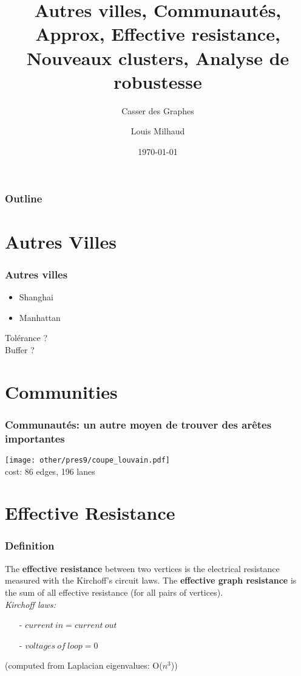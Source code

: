 \documentclass[aspectratio=169]{beamer}
\title{Autres villes, Communautés, Approx, Effective resistance, Nouveaux clusters, Analyse de robustesse}
\subtitle{Casser des Graphes}
\author{Louis Milhaud}
\institute{Complex Networks - LIP6}
\date{\today}
\begin{document}
    \begin{frame}
        \titlepage
    \end{frame}

    \begin{frame}
        \frametitle{Outline}
        \tableofcontents
    \end{frame}

    \section{Autres Villes}
    \begin{frame}
        \frametitle{Autres villes}
        \begin{itemize}
            \item Shanghai
            \item Manhattan
        \end{itemize}
        Tolérance ?\\
        Buffer ?    
    \end{frame}

    \section{Communities}
    \begin{frame}
        \frametitle{Communautés: un autre moyen de trouver des arêtes importantes}
        \centering
        \texttt{[image: other/pres9/coupe\_louvain.pdf]}\\
        cost: 86 edges, 196 lanes
    \end{frame}

    \section{Effective Resistance}
    \begin{frame}
        \frametitle{Definition}
            The \textbf{effective resistance} between two vertices is the electrical resistance measured with the Kirchoff's circuit laws. The \textbf{effective graph resistance} is the sum of all effective resistance (for all pairs of vertices).
            \vspace{10pt}\\
            \emph{Kirchoff laws:}
            \begin{itemize}
                \item[-] $current\ in = current\ out$
                \item[-] $voltages\ of\ loop = 0 $
            \end{itemize}
            (computed from Laplacian eigenvalues: O($n^3$))
    \end{frame}
    
\end{document}
